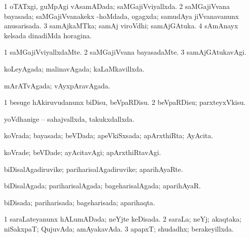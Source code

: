 {{\bentry
{} 
\gl{\gu}
\expl{}
\bmng
\bnum
\num{1} oTATxgi, guMpAgi vAsamADada; saMGajiVviyallxda. 
\num{2} saMGajiVvana bayasada; saMGajiVvanakekx -hoMdada, ogagxda; samudAya jiVvanavanunx anusarisada. 
\num{3} samAjkaMTka; samAj viroVdhi; samAjGAtuka. 
\num{4} sAmAnayx kelsada dinadiMda horagina. 
\enum
\emng
\eentry

\bentry
{} 
\gl{\kirxvi}
\expl{}
\bmng
\bnum
\num{1} saMGajiVviyallxdaMte. 
\num{2} saMGajiVvana bayasadaMte. 
\num{3} samAjGAtukavAgi. 
\enum
\emng
\eentry

\bentry
{} 
\gl{\gu}
\expl{}
\bmng
koLeyAgada; malinavAgada; kaLaMkavillxda. 
\emng
\eentry

\bentry
{} 
\gl{\gu}
\expl{}
\bmng
mArATvAgada; vAyxpAravAgada. 
\emng
\eentry

\bentry
{} 
\gl{\sakirx}
\expl{}
\bmng
\bnum
\num{1} besuge hAkiruvudanunx biDisu, beVpaRDisu. 
\num{2} beVpaRDisu; parxteyxVkisu. 
\enum
\emng
\eentry

\bentry
{} 
\gl{\gu}
\expl{}
\bmng
yoVdhanige -- sahajvallxda, takukxdallxda. 
\emng
\eentry

\bentry
{} 
\gl{\gu}
\expl{}
\bmng
koVrada; bayasada; beVDada; apeVkiSxsada; apArxthiRta; AyAcita. 
\emng
\eentry

\bentry
{} 
\gl{\kirxvi}
\expl{}
\bmng
koVrade; beVDade; ayAcitavAgi; apArxthiRtavAgi. 
\emng
\eentry

\bentry
{} 
\gl{\nA}
\expl{}
\bmng
biDisalAgadiruvike; pariharisalAgadiruvike; aparihAyaRte. 
\emng
\eentry

\bentry
{} 
\gl{\gu}
\expl{}
\bmng
biDisalAgada; pariharisalAgada; bageharisalAgada; aparihAyaR. 
\emng
\eentry

\bentry
{} 
\gl{\nA}
\expl{}
\bmng
{} 
\emng
\eentry

\bentry
{} 
\gl{\gu}
\expl{}
\bmng
biDisada; pariharisada; bageharisada; aparihaqta. 
\emng
\eentry

\bentry
{} 
\gl{\gu}
\expl{}
\bmng
\bnum
\num{1} saraLateyanunx hALumADada; neYjte keDisada. 
\num{2} saraLa; neYj; akaqtaka; niSakxpaT; QujuvAda; amAyakavAda. 
\num{3} apapxT; shudadhx; berakeyillxda. 
\enum
\emng
\eentry

}}
